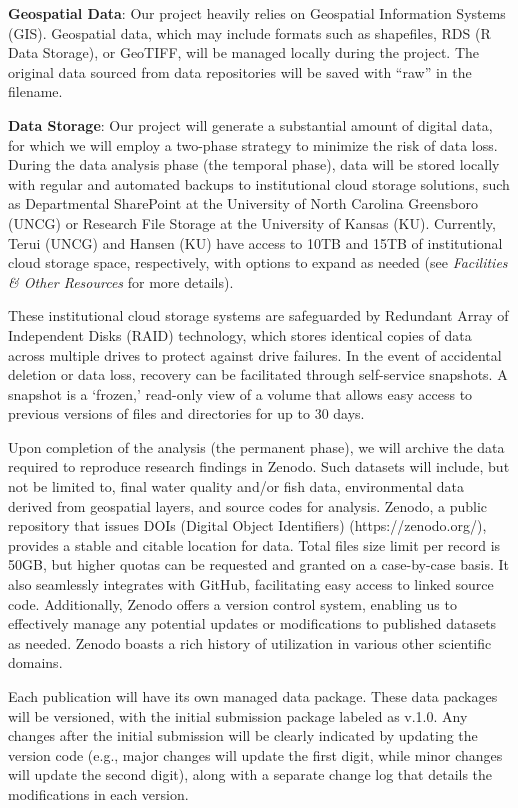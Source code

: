 \documentclass[12pt, class=article, crop=false]{standalone}
\begin{document}
\textbf{Geospatial Data}: Our project heavily relies on Geospatial Information Systems (GIS). Geospatial data, which may include formats such as shapefiles, RDS (R Data Storage), or GeoTIFF, will be managed locally during the project.
The original data sourced from data repositories will be saved with ``raw'' in the filename.

\textbf{Data Storage}:
Our project will generate a substantial amount of digital data, for which we will employ a two-phase strategy to minimize the risk of data loss.
During the data analysis phase (the temporal phase), data will be stored locally with regular and automated backups to institutional cloud storage solutions, such as Departmental SharePoint at the University of North Carolina Greensboro (UNCG) or Research File Storage at the University of Kansas (KU). 
Currently, Terui (UNCG) and Hansen (KU) have access to 10TB and 15TB of institutional cloud storage space, respectively, with options to expand as needed (see \textit{Facilities \& Other Resources} for more details).

These institutional cloud storage systems are safeguarded by Redundant Array of Independent Disks (RAID) technology, which stores identical copies of data across multiple drives to protect against drive failures.
In the event of accidental deletion or data loss, recovery can be facilitated through self-service snapshots.
A snapshot is a ‘frozen,’ read-only view of a volume that allows easy access to previous versions of files and directories for up to 30 days. 

Upon completion of the analysis (the permanent phase), we will archive the data required to reproduce research findings in Zenodo.
Such datasets will include, but not be limited to, final water quality and/or fish data, environmental data derived from geospatial layers, and source codes for analysis.
Zenodo, a public repository that issues DOIs (Digital Object Identifiers) (https://zenodo.org/), provides a stable and citable location for data.
Total files size limit per record is 50GB, but higher quotas can be requested and granted on a case-by-case basis.
It also seamlessly integrates with GitHub, facilitating easy access to linked source code.
Additionally, Zenodo offers a version control system, enabling us to effectively manage any potential updates or modifications to published datasets as needed.
Zenodo boasts a rich history of utilization in various other scientific domains.

Each publication will have its own managed data package.
These data packages will be versioned, with the initial submission package labeled as v.1.0. Any changes after the initial submission will be clearly indicated by updating the version code (e.g., major changes will update the first digit, while minor changes will update the second digit), along with a separate change log that details the modifications in each version.
\end{document}
